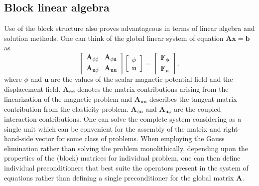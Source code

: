 \documentclass[11pt,a4paper,final]{article}
\begin{document}
\subsection{\textbf{Block linear algebra}} Use of the block structure also proves advantageous in terms of linear algebra and solution methods. One can think of the global linear system of equation $\mathbf{A}\mathbf{x} = \mathbf{b}$ as
\begin{equation*}
\begin{bmatrix}
\mathbf{A}_{\phi\phi} & \mathbf{A}_{\phi \mathbf{u}} \\
\mathbf{A}_{\mathbf{u} \phi} & \mathbf{A}_{\mathbf{u}\mathbf{u}} 
\end{bmatrix}
\begin{bmatrix}
\phi \\
\mathbf{u}
\end{bmatrix} 
= 
\begin{bmatrix}
\mathbf{F_{\phi}} \\
\mathbf{F_{\mathbf{u}}}
\end{bmatrix},
\end{equation*}
where $\phi$ and $\mathbf{u}$ are the values of the scalar magnetic potential field and the displacement field. $\mathbf{A}_{\phi\phi}$ denotes the matrix contributions arising from the linearization of the magnetic problem and $\mathbf{A}_{\mathbf{u}\mathbf{u}}$ describes the tangent matrix contribution from the elasticity problem. $\mathbf{A}_{\phi \mathbf{u}}$ and $\mathbf{A}_{\mathbf{u} \phi}$ are the coupled interaction contributions. One can solve the complete system considering as a single unit which can be convenient for the assembly of the matrix and right-hand-side vector for some class of problems. When employing the Gauss elimination rather than solving the problem monolithically, depending upon the properties of the (block) matrices for individual problem, one can then define individual preconditioners that best suite the operators present in the system of equations rather than defining a single preconditioner for the global matrix $\mathbf{A}$.
\end{document}

